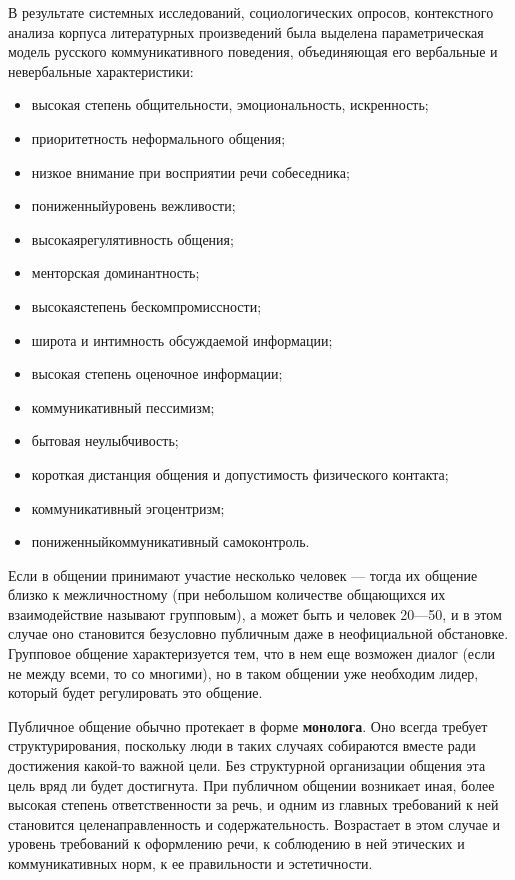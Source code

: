 \documentclass[a4paper,12pt]{article}
\begin{document}
\begin{large}
 В результате системных исследований, социологических опросов, контекстного анализа
 корпуса литературных произведений была выделена параметрическая модель русского коммуникативного поведения, объединяющая его вербальные и невербальные характеристики:
 \begin{itemize}[noitemsep] 
    \item высокая степень общительности, эмоциональность, искренность;
    \item приоритетность неформального общения;
    \item низкое внимание при восприятии речи собеседника;
    \item пониженныйуровень вежливости;
    \item высокаярегулятивность общения;
    \item менторская доминантность;
    \item высокаястепень бескомпромиссности;
    \item широта и интимность обсуждаемой информации;
    \item высокая степень оценочное информации;
    \item коммуникативный пессимизм;
    \item бытовая неулыбчивость;
    \item короткая дистанция общения и допустимость физического контакта;
    \item коммуникативный эгоцентризм;
    \item пониженныйкоммуникативный самоконтроль.
\end{itemize}

Если в общении принимают участие несколько человек — тогда их общение близко к межличностному (при небольшом количестве общающихся их взаимодействие называют групповым), а может быть и человек 20—50, и в этом случае оно становится безусловно публичным даже в неофициальной обстановке. Групповое общение характеризуется тем, что в нем еще возможен диалог (если не между всеми, то со многими), но в таком общении уже необходим лидер, который будет регулировать это общение.

 Публичное общение обычно протекает в форме \textbf{монолога}. Оно всегда требует структурирования, поскольку люди в таких случаях собираются вместе ради достижения какой-то важной цели. Без структурной организации общения эта цель вряд ли будет достигнута. При публичном общении возникает иная, более высокая степень ответственности за речь, и одним из главных требований к ней становится целенаправленность и содержательность. Возрастает в этом случае и уровень требований к оформлению речи, к соблюдению в ней этических и коммуникативных норм, к ее правильности и эстетичности.


\end{large}
\end{document}
